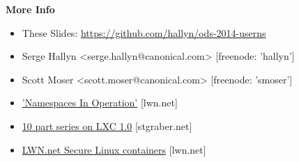 \documentclass{beamer}
\begin{document}
\begin{frame}
\textbf{More Info}
\begin{itemize}
  \item These Slides: \url{https://github.com/hallyn/ods-2014-userns}
  \item Serge Hallyn <serge.hallyn@canonical.com> [freenode: 'hallyn']
  \item Scott Moser <scott.moser@canonical.com> [freenode: 'smoser']
  \item \href{http://lwn.net/Articles/531114/}{'Namespaces In Operation'} [lwn.net]
  \item \href{https://www.stgraber.org/2013/12/20/lxc-1-0-blog-post-series/}{10 part series on LXC 1.0} [stgraber.net]
  \item \href{http://lwn.net/Articles/515034/}{LWN.net Secure Linux containers} [lwn.net]
\end{itemize}
\end{frame}

\end{document}
